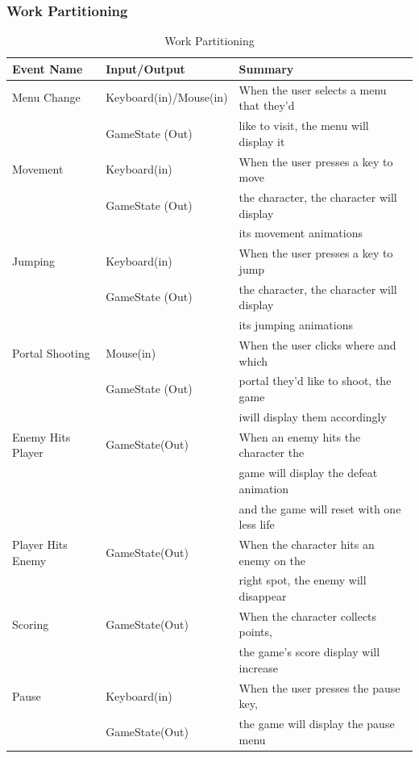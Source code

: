 \documentclass[12pt, titlepage]{article}
\begin{document}
\subsubsection{Work Partitioning}
\begin{table}[H]
\caption{Work Partitioning}
\begin{tabular}{lll}
\hline
Event Name & Input/Output & Summary\\
\hline
Menu Change      	&  Keyboard(in)/Mouse(in)  & When the user selects a menu that they'd\\
& GameState (Out) & like to visit, the menu will display it   \\

Movement      		&  Keyboard(in)  & When the user presses a key to move\\  
& GameState (Out) & the character, the character will display \\
& & its movement animations   \\

Jumping		 &  Keyboard(in)  & When the user presses a key to jump\\  
& GameState (Out) & the character, the character will display \\
& & its jumping animations   \\

Portal Shooting	 &  Mouse(in)  & When the user clicks where and which\\  
& GameState (Out) & portal they'd like to shoot, the game \\
& & iwill display them accordingly   \\

Enemy Hits Player			 &  GameState(Out)  & When an enemy hits the character the \\  
& & game will display the defeat animation \\
& & and the game will reset with one less life   \\

Player Hits Enemy		 &  GameState(Out)  & When the character hits an enemy on the\\  
& &  right spot, the enemy will disappear \\

Scoring	 &  GameState(Out)  & When the character collects points,  \\  
& & the game's score display will increase \\

Pause	 &   Keyboard(in) & When the user presses the pause key, \\  
& GameState(Out)& the game will display the pause menu \\
\hline
\end{tabular}
\end{table}
\end{document}
